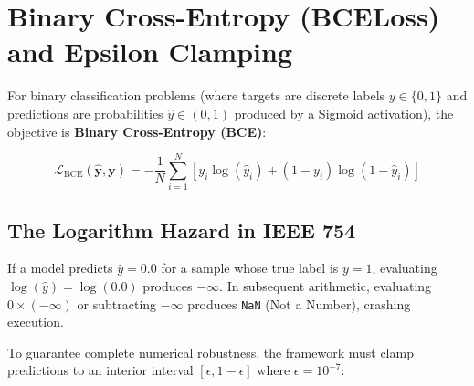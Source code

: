 \documentclass[
  letterpaper,
]{scrbook}
\begin{document}
\section{Binary Cross-Entropy (BCELoss) and Epsilon
Clamping}\label{binary-cross-entropy-bceloss-and-epsilon-clamping}

For binary classification problems (where targets are discrete labels
\(y \in \{0, 1\}\) and predictions are probabilities
\(\hat{y} \in (0, 1)\) produced by a Sigmoid activation), the objective
is \textbf{Binary Cross-Entropy (BCE)}:

\[\mathcal{L}_{\text{BCE}}(\hat{\mathbf{y}}, \mathbf{y}) = -\frac{1}{N} \sum_{i=1}^N \left[ y_i \log(\hat{y}_i) + (1 - y_i) \log(1 - \hat{y}_i) \right]\]

\subsection{The Logarithm Hazard in IEEE
754}\label{the-logarithm-hazard-in-ieee-754}

If a model predicts \(\hat{y} = 0.0\) for a sample whose true label is
\(y = 1\), evaluating \(\log(\hat{y}) = \log(0.0)\) produces
\(-\infty\). In subsequent arithmetic, evaluating \(0 \times (-\infty)\)
or subtracting \(-\infty\) produces \texttt{NaN} (Not a Number),
crashing execution.

To guarantee complete numerical robustness, the framework must clamp
predictions to an interior interval \([\epsilon, 1 - \epsilon]\) where
\(\epsilon = 10^{-7}\):
\end{document}
